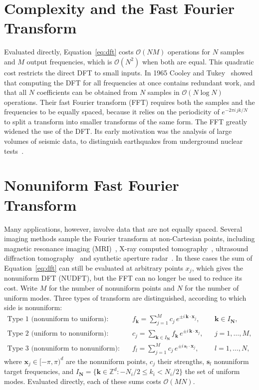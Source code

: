 \section{Complexity and the Fast Fourier Transform}
\label{sec:fft}

Evaluated directly, Equation~\eqref{eq:dft} costs $\mathcal{O}(NM)$
operations for $N$ samples and $M$ output frequencies, which is
$\mathcal{O}(N^2)$ when both are equal. This quadratic cost restricts the
direct DFT to small inputs. In 1965 Cooley and Tukey~\cite{cooley1965} showed
that computing the DFT for all frequencies at once contains redundant work,
and that all $N$ coefficients can be obtained from $N$ samples in
$\mathcal{O}(N \log N)$ operations. Their fast Fourier transform (FFT)
requires both the samples and the frequencies to be equally spaced, because
it relies on the periodicity of $e^{-2\pi i\, jk/N}$ to split a transform into
smaller transforms of the same form. The FFT greatly widened the use of the
DFT. Its early motivation was the analysis of large volumes of seismic
data, to distinguish earthquakes from underground nuclear
tests~\cite{rockmore2000}.

\section{Nonuniform Fast Fourier Transform}
\label{sec:nufft}

Many applications, however, involve data that are not equally spaced. Several
imaging methods sample the Fourier transform at non-Cartesian points,
including magnetic resonance imaging (MRI)~\cite{sutton2003,lee2005}, X-ray
computed tomography~\cite{fourmont2003}, ultrasound diffraction
tomography~\cite{bronstein2002} and synthetic aperture
radar~\cite{andersson2012}. In these cases the sum of
Equation~\eqref{eq:dft} can still be evaluated at arbitrary points $x_j$,
which gives the nonuniform DFT (NUDFT), but the FFT can no longer be used to
reduce its cost. Write $M$ for the number of nonuniform points and $N$ for the
number of uniform modes. Three types of transform are distinguished,
according to which side is nonuniform:
\begin{align}
    \text{Type 1 (nonuniform to uniform):}\quad
    & f_{\mathbf{k}} = \sum_{j=1}^{M} c_j\, e^{\pm i\, \mathbf{k} \cdot \mathbf{x}_j},
    && \mathbf{k} \in I_{\mathbf{N}},
    \label{eq:type1} \\
    \text{Type 2 (uniform to nonuniform):}\quad
    & c_j = \sum_{\mathbf{k} \in I_{\mathbf{N}}} f_{\mathbf{k}}\, e^{\pm i\, \mathbf{k} \cdot \mathbf{x}_j},
    && j = 1, \dots, M,
    \label{eq:type2} \\
    \text{Type 3 (nonuniform to nonuniform):}\quad
    & f_l = \sum_{j=1}^{M} c_j\, e^{\pm i\, \mathbf{s}_l \cdot \mathbf{x}_j},
    && l = 1, \dots, N,
    \label{eq:type3}
\end{align}
where $\mathbf{x}_j \in [-\pi, \pi)^d$ are the nonuniform points, $c_j$ their
strengths, $\mathbf{s}_l$ nonuniform target frequencies, and
$I_{\mathbf{N}} = \{\mathbf{k} \in \mathbb{Z}^d : -N_i/2 \le k_i < N_i/2\}$
the set of uniform modes. Evaluated directly, each of these sums costs
$\mathcal{O}(MN)$.

